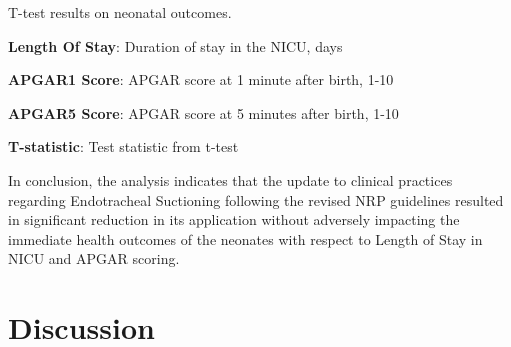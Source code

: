 \documentclass[11pt]{article}
\begin{document}
\begin{table}[h]
\caption{\protect\hyperlink{file-table-2-pkl}{Impact of change in treatment policy on neonatal outcomes.}}
\label{table:Neonate_Outcomes}
\begin{threeparttable}
\renewcommand{\TPTminimum}{\linewidth}
\begin{tablenotes}
\footnotesize
\item T-test results on neonatal outcomes.
\item \textbf{Length Of Stay}: Duration of stay in the NICU, days
\item \textbf{APGAR1 Score}: APGAR score at 1 minute after birth, 1-10
\item \textbf{APGAR5 Score}: APGAR score at 5 minutes after birth, 1-10
\item \textbf{T-statistic}: Test statistic from t-test
\end{tablenotes}
\end{threeparttable}
\end{table}


In conclusion, the analysis indicates that the update to clinical practices regarding Endotracheal Suctioning following the revised NRP guidelines resulted in significant reduction in its application without adversely impacting the immediate health outcomes of the neonates with respect to Length of Stay in NICU and APGAR scoring.

\section*{Discussion}
\end{document}
